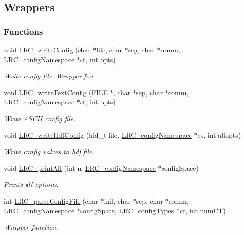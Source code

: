 \hypertarget{group___l_r_c__wrappers}{
\subsection{Wrappers}
\label{group___l_r_c__wrappers}
}
\subsubsection*{Functions}
\begin{DoxyCompactItemize}
\item 
void \hyperlink{group___l_r_c__wrappers_ga51e21668c4d2e0f397b7d20ac8b9cc50}{LRC\_\-writeConfig} (char $\ast$file, char $\ast$sep, char $\ast$comm, \hyperlink{struct_l_r_c__config_namespace}{LRC\_\-configNamespace} $\ast$ct, int opts)
\begin{DoxyCompactList}\small\item\em Write config file. Wrapper for. \item\end{DoxyCompactList}\item 
void \hyperlink{group___l_r_c__wrappers_ga42c90a023c4cc3048b39a65245e889e4}{LRC\_\-writeTextConfig} (FILE $\ast$, char $\ast$sep, char $\ast$comm, \hyperlink{struct_l_r_c__config_namespace}{LRC\_\-configNamespace} $\ast$ct, int opts)
\begin{DoxyCompactList}\small\item\em Write ASCII config file. \item\end{DoxyCompactList}\item 
void \hyperlink{group___l_r_c__wrappers_ga142e285d5c8a3e6761d1a86668cfe9eb}{LRC\_\-writeHdfConfig} (hid\_\-t file, \hyperlink{struct_l_r_c__config_namespace}{LRC\_\-configNamespace} $\ast$cs, int allopts)
\begin{DoxyCompactList}\small\item\em Write config values to hdf file. \item\end{DoxyCompactList}\item 
void \hyperlink{group___l_r_c__wrappers_ga434aa10adcbb1572b06ed29b01187716}{LRC\_\-printAll} (int n, \hyperlink{struct_l_r_c__config_namespace}{LRC\_\-configNamespace} $\ast$configSpace)
\begin{DoxyCompactList}\small\item\em Prints all options. \item\end{DoxyCompactList}\item 
int \hyperlink{group___l_r_c__wrappers_ga98adf1a77ae325830d4521b691ca33b0}{LRC\_\-parseConfigFile} (char $\ast$inif, char $\ast$sep, char $\ast$comm, \hyperlink{struct_l_r_c__config_namespace}{LRC\_\-configNamespace} $\ast$configSpace, \hyperlink{struct_l_r_c__config_types}{LRC\_\-configTypes} $\ast$ct, int numCT)
\begin{DoxyCompactList}\small\item\em Wrapper function. \item\end{DoxyCompactList}\end{DoxyCompactItemize}


